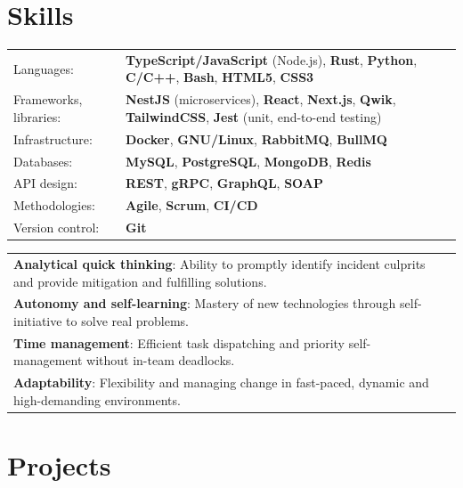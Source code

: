 \documentclass[a4paper,10pt]{article}
\begin{document}
\section{Skills}
\begin{tabularx}{\linewidth}{@{}l X@{}}
    Languages: & {\footnotesize \textbf{TypeScript/JavaScript} (Node.js), \textbf{Rust}, \textbf{Python}, \textbf{C/C++}, \textbf{Bash}, \textbf{HTML5}, \textbf{CSS3}} \\
    Frameworks, libraries: & {\footnotesize \textbf{NestJS} (microservices), \textbf{React}, \textbf{Next.js}, \textbf{Qwik}, \textbf{TailwindCSS}, \textbf{Jest} (unit, end-to-end testing)} \\
    Infrastructure: & {\footnotesize \textbf{Docker}, \textbf{GNU/Linux}, \textbf{RabbitMQ}, \textbf{BullMQ}} \\
    Databases: & {\footnotesize \textbf{MySQL}, \textbf{PostgreSQL}, \textbf{MongoDB}, \textbf{Redis}} \\
    API design: & {\footnotesize \textbf{REST}, \textbf{gRPC}, \textbf{GraphQL}, \textbf{SOAP}} \\
    Methodologies: & {\footnotesize \textbf{Agile}, \textbf{Scrum}, \textbf{CI/CD}} \\
    Version control: & {\footnotesize \textbf{Git}} \\
\end{tabularx}

\begin{tabularx}{\linewidth}{@{}l X@{}}
    \textbf{Analytical quick thinking}: Ability to promptly identify incident culprits and provide mitigation and fulfilling solutions. \\
    \textbf{Autonomy and self-learning}: Mastery of new technologies through self-initiative to solve real problems. \\
    \textbf{Time management}: Efficient task dispatching and priority self-management without in-team deadlocks. \\
    \textbf{Adaptability}: Flexibility and managing change in fast-paced, dynamic and high-demanding environments. \\
\end{tabularx}


\section{Projects}
\end{document}
